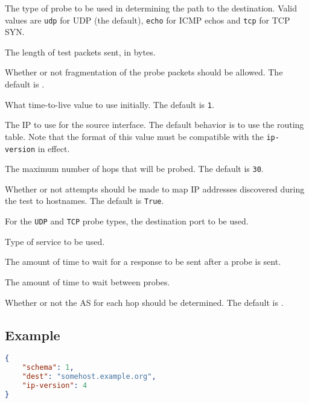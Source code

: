 \documentclass[10pt]{article}
\begin{document}
 The type of probe to be used in
determining the path to the destination.  Valid values are {\tt udp}
for UDP (the default), {\tt echo} for ICMP echos and {\tt tcp} for TCP
SYN.

 The length of test packets sent, in
bytes.

 Whether or not fragmentation of the
probe packets should be allowed.  The default is \false.

 What time-to-live value to use
initially.  The default is {\tt 1}.




 The IP to use for the source interface.  The
default behavior is to use the routing table.  Note that the format of
this value must be compatible with the {\tt ip-version} in effect.

 The maximum number of hops that will be
probed.  The default is {\tt 30}.

 Whether or not attempts should be made
to map IP addresses discovered during the test to hostnames.  The
default is {\tt True}.

 For the {\tt UDP} and {\tt TCP} probe
types, the destination port to be used.

 Type of service to be used.  

 The amount of time to wait for a response
to be sent after a probe is sent.



 The amount of time to wait between
probes.

 Whether or not the AS for each hop should be
determined.  The default is \false.



\subsection{Example}
\begin{lstlisting}[language=json]
{
    "schema": 1,
    "dest": "somehost.example.org",
    "ip-version": 4
}
\end{lstlisting}
\end{document}
